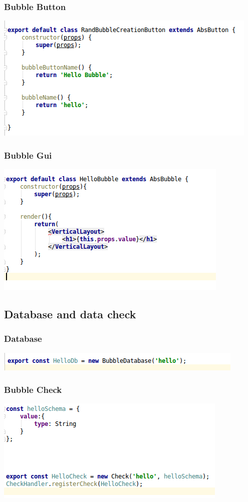 \begin{frame}
	\frametitle{Bubble Button}
	\begin{center}
	\includegraphics[scale=0.50]{code/hellobubblecreationbutton.png}
	\end{center}
\end{frame}

\begin{frame}
	\frametitle{Bubble Gui}
	\begin{center}
	\includegraphics[scale=0.60]{code/hellobubble.png}
	\end{center}
\end{frame}

\subsection{Database and data check}

\begin{frame}
	\frametitle{Database}
	\begin{center}
	\includegraphics[scale=0.60]{code/helloDb.png}
	\end{center}
\end{frame}

\begin{frame}
	\frametitle{Bubble Check}
	\begin{center}
	\includegraphics[scale=0.60]{code/hellocheck.png}
	\end{center}
\end{frame}

